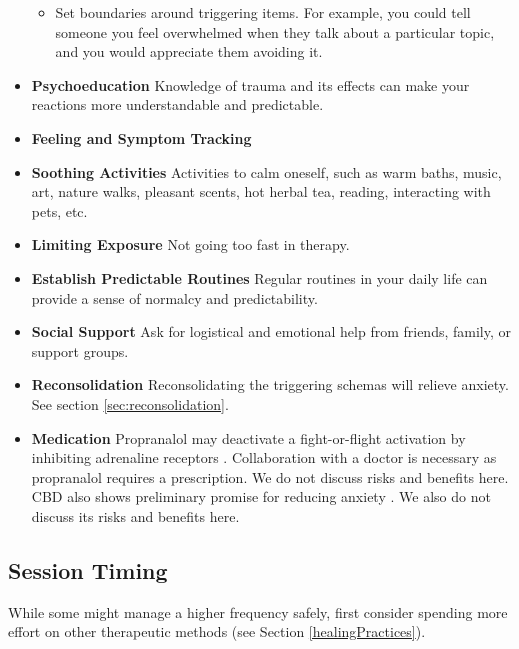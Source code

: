 \documentclass[12pt,letterpaper]{article}
\begin{document}
\begin{itemize}
\begin{itemize}
        \item Set boundaries around triggering items. For example, you could tell someone you feel overwhelmed when they talk about a particular topic, and you would appreciate them avoiding it.
    \end{itemize}
    \item \textbf{Psychoeducation} Knowledge of trauma and its effects can make your reactions more understandable and predictable. 
    \item \textbf{Feeling and Symptom Tracking} 
    \item \textbf{Soothing Activities} Activities to calm oneself, such as warm baths, music, art, nature walks, pleasant scents, hot herbal tea, reading, interacting with pets, etc. 
    \item \textbf{Limiting Exposure} Not going too fast in therapy.  
    \item \textbf{Establish Predictable Routines} Regular routines in your daily life can provide a sense of normalcy and predictability. 
    \item \textbf{Social Support} Ask for logistical and emotional help from friends, family, or support groups. 
    \item \textbf{Reconsolidation} Reconsolidating the triggering schemas will relieve anxiety. See section \ref{sec:reconsolidation}.
    \item \textbf{Medication} Propranalol may deactivate a fight-or-flight activation by inhibiting adrenaline receptors \cite{steenenPropranalol}. Collaboration with a doctor is necessary as propranalol requires a prescription. We do not discuss risks and benefits here. CBD also shows preliminary promise for reducing anxiety \cite{skelleyCBD}. We also do not discuss its risks and benefits here.
\end{itemize}
\subsection{Session Timing}
While some might manage a higher frequency safely, first consider spending more effort on other therapeutic methods (see Section \ref{healingPractices}). 
\end{document}
